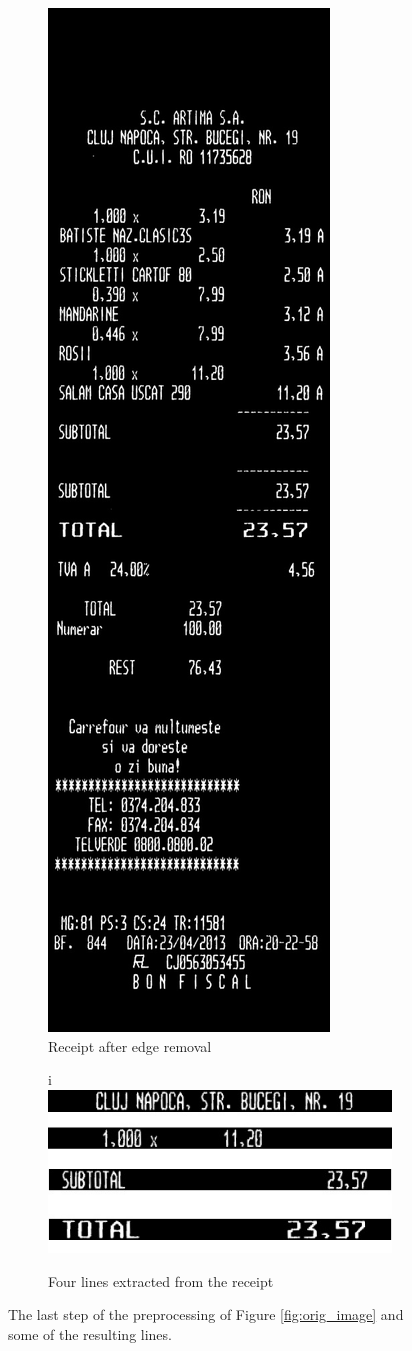 \begin{figure}
\ContinuedFloat 
\centering
\begin{subfigure}{0.49\linewidth}
  \centering
  \includegraphics[width=.4\linewidth]{img/cleaned.jpg}
  \caption{Receipt after edge removal}
  \label{fig:edge_image}
\end{subfigure}
\begin{subfigure}{0.49\linewidth}
  \centering
i  \includegraphics[width=\linewidth]{img/lines.jpg}
  \caption{Four lines extracted from the receipt}
  \label{fig:line_samples}
\end{subfigure}
\caption{\label{fig:receipts2}
The last step of the preprocessing of Figure \ref{fig:orig_image} and some of the resulting lines. }
\end{figure}


